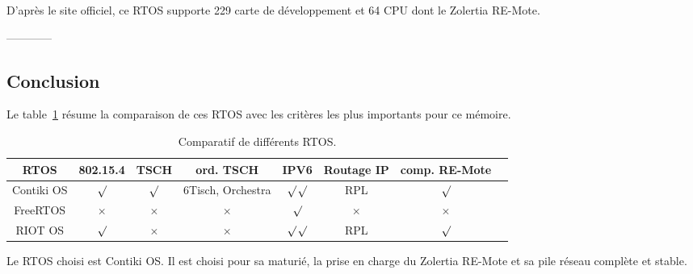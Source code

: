     D'après le site officiel, ce RTOS supporte 229 carte de développement et 64 CPU dont le Zolertia RE-Mote. 


------------\\
\subsection*{Conclusion}
Le table~\ref{tb:state-rtos-choice} résume la comparaison de ces RTOS avec les critères les plus importants pour ce mémoire.

\begin{table}[H]
    \begin{adjustbox}{width=\textwidth}
        \begin{tabular}{c||c|c|c|c|c|c|c}
            RTOS       & 802.15.4 &   TSCH   &     ord. TSCH     &       IPV6     & Routage IP & comp. RE-Mote\\ \hline
            
            Contiki OS & $\surd$  & $\surd$  & 6Tisch, Orchestra & $\surd$$\surd$ &     RPL    & $\surd$ \\ \hline
            
            FreeRTOS   & $\times$ & $\times$ &      $\times$     &     $\surd$    &  $\times$  & $\times$\\ \hline
            RIOT OS    & $\surd$  & $\times$ &      $\times$     & $\surd$$\surd$ &     RPL    &$\surd$ \\
        \end{tabular}
    \end{adjustbox}
    \caption{Comparatif de différents RTOS.}
    \label{tb:state-rtos-choice}
\end{table}
Le RTOS choisi est Contiki OS. Il est choisi pour sa maturié, la prise en charge du Zolertia RE-Mote et sa pile réseau complète et stable.

